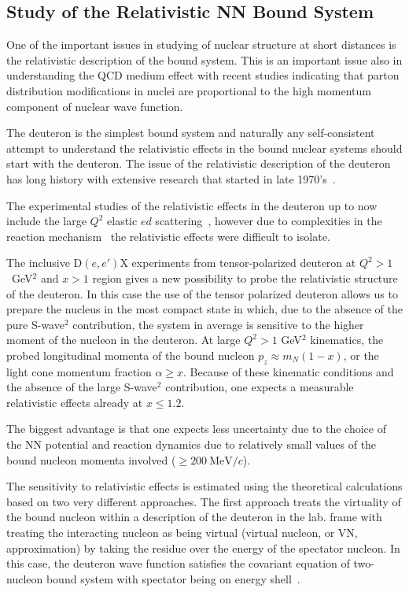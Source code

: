 \subsection{Study of the Relativistic NN Bound System}

One of the important issues in studying of nuclear structure  at short distances is the 
relativistic description of the bound system.  This is an important issue also in 
understanding the QCD medium effect with recent studies indicating that  parton distribution 
modifications  in nuclei are proportional to the high momentum component of nuclear wave function.

The deuteron is the simplest bound system and naturally any self-consistent attempt  to understand the 
relativistic effects in the bound nuclear systems  should start with the deuteron. 
The issue of the relativistic description of the deuteron has long history with extensive research that started in late 1970's~\cite{Gross:1982nz,Buck:1979ff,Frankfurt:1977vc,Frankfurt:1981mk}.

The experimental studies of the relativistic effects in the deuteron  up to now include the large $Q^2$ elastic 
$ed$ scattering~\cite{Alexa:1998fe}, however  
due to complexities  in the reaction mechanism~\cite{VanOrden:1995eg} the relativistic effects were 
difficult to isolate.

The inclusive D$(e,e')$X experiments from tensor-polarized deuteron at  $Q^2>1$~GeV$^2$ and $x>1$ region gives 
a new possibility to probe the relativistic structure of the deuteron.  In this case the use of the tensor polarized
deuteron allows us to prepare the nucleus in the most compact state in which, due to the absence of the 
pure S-wave$^2$ contribution, the system in average is sensitive to the higher moment of the nucleon in the deuteron.
At large $Q^2>1$ GeV$^2$ kinematics, the probed longitudinal momenta of the bound nucleon $p_z \approx m_N(1-x)$, 
or the light cone momentum fraction $\alpha \ge x$. Because of these kinematic conditions and the absence of the 
large S-wave$^2$ contribution, one expects a measurable relativistic effects already at $x\le 1.2$.  

The biggest advantage is that one expects less uncertainty due to the choice of the NN potential  and reaction dynamics due to relatively small values of the bound nucleon momenta involved ($\ge 200~\mathrm{MeV}/c$).

The sensitivity to relativistic effects is estimated using the theoretical calculations based on two 
very different approaches.   The first approach treats the  virtuality of the bound nucleon within a
description of the deuteron in the lab. frame  with treating the interacting nucleon as being 
virtual (virtual nucleon, or VN, approximation) 
by taking the residue over the energy of the spectator nucleon.
In this case, the deuteron wave function satisfies the covariant equation of two-nucleon bound system 
with spectator being on energy shell~\cite{Sargsian:2009hf,Gross:2010qm}.

